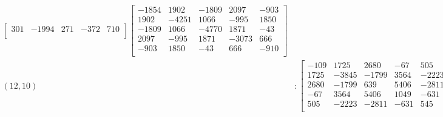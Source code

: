 \documentclass[12pt]{amsart}
\theoremstyle{plain}
\theoremstyle{definition}
\begin{document}
\begin{landscape}
\begin{align*}
\begin{bmatrix}
 301  &   -1994  &   271  &   -372  &   710  \\ 
\end{bmatrix}
\begin{bmatrix}
-1854  &   1902  &   -1809  &   2097  &   -903  \\ 
 1902  &   -4251  &   1066  &   -995  &   1850  \\ 
 -1809  &   1066  &   -4770  &   1871  &   -43  \\ 
 2097  &   -995  &   1871  &   -3073  &   666  \\ 
 -903  &   1850  &   -43  &   666  &   -910  \\ 
\end{bmatrix}
\\
(12,10) &:
\begin{bmatrix}
-109  &   1725  &   2680  &   -67  &   505  \\ 
 1725  &   -3845  &   -1799  &   3564  &   -2223  \\ 
 2680  &   -1799  &   639  &   5406  &   -2811  \\ 
 -67  &   3564  &   5406  &   1049  &   -631  \\ 
 505  &   -2223  &   -2811  &   -631  &   545  \\ 
\end{bmatrix}
\begin{bmatrix}
-2389  &   -1019  &   -1617  &   3433  &   -1020  \\ 
 -1019  &   1050  &   1761  &   1352  &   -1788  \\ 
 -1617  &   1761  &   3856  &   5511  &   -3130  \\ 
 3433  &   1352  &   5511  &   254  &   501  \\ 
 -1020  &   -1788  &   -3130  &   501  &   -2049  \\ 
\end{bmatrix}
\begin{bmatrix}
1046  &   -937  &   -1071  &   1055  &   210  \\ 
 -937  &   523  &   1782  &   640  &   -155  \\ 
 -1071  &   1782  &   1597  &   4252  &   -1772  \\ 
 1055  &   640  &   4252  &   2052  &   -1740  \\ 
 210  &   -155  &   -1772  &   -1740  &   520  \\ 
\end{bmatrix}
\begin{bmatrix}
-1465  &   800  &   -136  &   -1001  &   -44  \\ 

\end{bmatrix}
\end{align*}
\end{landscape}
\end{document}

